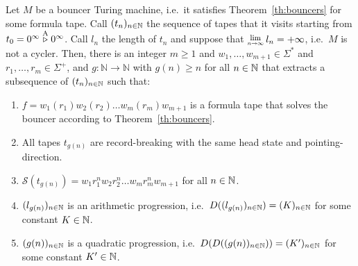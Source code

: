 \begin{theorem}\label{th:linquad}
    Let $M$ be a bouncer Turing machine, i.e.\ it satisfies Theorem~\ref{th:bouncers} for some formula tape. Call $(t_n)_{n\in\mathbb{N}}$ the sequence of tapes that it visits starting from $t_0 = 0^\infty \stackrel{\text{A}}\triangleright 0^\infty$. Call $l_n$ the length of $t_n$ and suppose that $\Lim{n\to\infty} l_n = +\infty$, i.e.\ $M$ is not a cycler. Then, there is an integer $m \geq 1$ and $w_1, \dots, w_{m+1} \in \Sigma^*$ and $r_1, \dots, r_{m} \in \Sigma^+$, and $g: \mathbb{N} \to \mathbb{N}$ with $g(n) \geq n$ for all $n\in\mathbb{N}$ that extracts a subsequence of $(t_n)_{n\in\mathbb{N}}$ such that:

    \begin{enumerate}
        \item $f = w_1 (r_1) w_2 (r_2) \dots w_m (r_m) w_{m+1}$ is a formula tape that solves the bouncer according to Theorem~\ref{th:bouncers}.
        \item All tapes $t_{g(n)}$ are record-breaking with the same head state and pointing-direction.
        \item $\mathcal{S}(t_{g(n)})=w_1 r_1^n w_2 r_2^n \dots w_m r_m^n w_{m+1}$ for all $n\in\mathbb{N}$.

        \item $(l_{g(n)})_{n\in\mathbb{N}}$ is an arithmetic progression, i.e.\ $D((l_{g(n)})_{n\in\mathbb{N}}) = (K)_{n\in\mathbb{N}}$ for some constant $K\in\mathbb{N}$.
        \item $(g(n))_{n\in\mathbb{N}}$ is a quadratic progression, i.e.\ $D(D((g(n))_{n\in\mathbb{N}})) = (K')_{n\in\mathbb{N}}$ for some constant $K'\in\mathbb{N}$.
    \end{enumerate}
\end{theorem}

